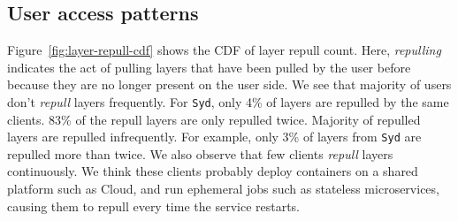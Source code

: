 %
%

\subsection{User access patterns}


Figure~\ref{fig:layer-repull-cdf} shows the CDF of layer repull count. Here, \emph{repulling} indicates the act of pulling layers that have been pulled by the user before because they are no longer present on the user side.
We see that majority of users don't \emph{repull} layers frequently.
For \texttt{Syd}, only 4\% of layers are repulled by the same clients. 83\% of the repull layers are only repulled twice.
Majority of repulled layers are repulled infrequently.
For example, only 3\% of layers from \texttt{Syd} are repulled more than twice.
We also observe that few clients \emph{repull} layers continuously.
We think these clients probably deploy containers on a shared platform such as Cloud,
and run ephemeral jobs such as stateless microservices, causing them to repull every time the service restarts.

